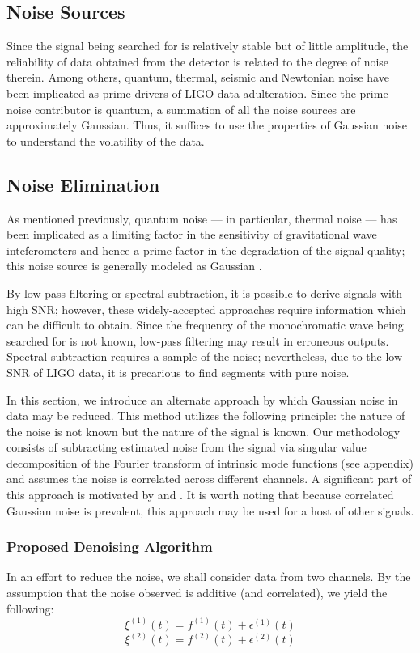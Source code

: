 \documentclass[onecolumn, groupedaddress, 10pt]{revtex4-1}
\begin{document}
\subsection{Noise Sources}
Since the signal being searched for is relatively stable but of little amplitude, the reliability of data obtained from the detector is related to the degree of noise therein. Among others, quantum, thermal, seismic and Newtonian noise have been implicated as prime drivers of LIGO data adulteration. Since the prime noise contributor is quantum, a summation of all the noise sources are approximately Gaussian. Thus, it suffices to use the properties of Gaussian noise to understand the volatility of the data.

\subsection{Noise Elimination}
As mentioned previously, quantum noise --- in particular, thermal noise --- has been implicated as a limiting factor in the sensitivity of gravitational wave inteferometers and hence a prime factor in the degradation of the signal quality; this noise source is generally modeled as Gaussian \citep{Saulson}.

By low-pass filtering or spectral subtraction, it is possible to derive signals with high SNR; however, these widely-accepted approaches require information which can be difficult to obtain. Since the frequency of the monochromatic wave being searched for is not known, low-pass filtering may result in erroneous outputs. Spectral subtraction requires a sample of the noise; nevertheless, due to the low SNR of LIGO data, it is precarious to find segments with pure noise.

In this section, we introduce an alternate approach by which Gaussian noise in data may be reduced. This method utilizes the following principle: the nature of the noise is not known but the nature of the signal is known. Our methodology consists of subtracting estimated noise from the signal via singular value decomposition of the Fourier transform of intrinsic mode functions (see appendix) and assumes the noise is correlated across different channels. A significant part of this approach is motivated by \cite{oweiss2001noise} and \cite{aminghafari2006multivariate}. It is worth noting that because correlated Gaussian noise is prevalent, this approach may be used for a host of other signals.

\subsubsection{Proposed Denoising Algorithm}
In an effort to reduce the noise, we shall consider data from two channels. By the assumption that the noise observed is additive (and correlated), we yield the following:
\begin{equation}
\xi^{(1)}(t) = f^{(1)}(t) + \epsilon^{(1)}(t)
\end{equation}
\begin{equation}
\xi^{(2)}(t) = f^{(2)}(t) + \epsilon^{(2)}(t)
\end{equation}
\end{document}
